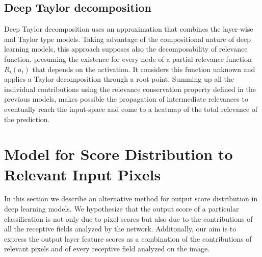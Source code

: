 \documentclass[preprint]{elsarticle}
\theoremstyle{definition} %
\theoremstyle{remark}
\begin{document}
\subsection{Deep Taylor decomposition}

Deep Taylor decomposition \cite{montavon2017explaining} uses an approximation that combines the layer-wise and Taylor type models. Taking advantage of the compositional nature of deep learning models, this approach supposes also the decomposability of relevance function, presuming the existence for every node of a partial relevance function $R_i(a_i)$ that depends on the activation. It considers this function unknown and applies a Taylor decomposition through a root point. Summing up all the individual contributions using the relevance conservation property defined in the previous models, makes possible the propagation of intermediate relevances to eventually reach the input-space and come to a heatmap of the total relevance of the prediction. 

\section{Model for Score Distribution to Relevant Input Pixels}\label{sec:math}

In this section we describe an alternative method for output score distribution in deep learning models. We hypothesize that the output score of a particular classification is not only due to pixel scores but also due to the contributions of all the receptive fields analyzed by the network. Additonally, our aim is to express the output layer feature scores as a combination of the contributions of relevant pixels and of every receptive field analyzed on the image. 
\end{document}
